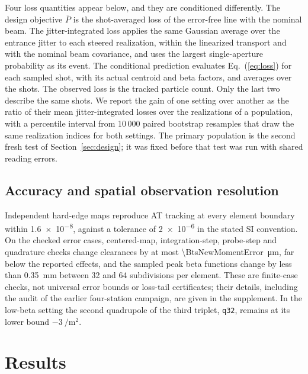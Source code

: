 \documentclass[final,5p,twocolumn]{elsarticle}
\begin{document}
Four loss quantities appear below, and they are conditioned differently. The design
objective $\bar P$ is the shot-averaged loss of the error-free line with the nominal beam.
The jitter-integrated loss applies the same Gaussian average over the entrance jitter to
each steered realization, within the linearized transport and with the nominal beam
covariance, and uses the largest single-aperture probability as its event. The
conditional prediction evaluates Eq.~(\ref{eq:loss}) for each sampled shot, with its
actual centroid and beta factors, and averages over the shots. The observed loss is the
tracked particle count. Only the last two describe the same shots. We report the gain of
one setting over another as the ratio of their mean jitter-integrated losses over the
realizations of a population, with a percentile interval from 10\,000 paired bootstrap
resamples that draw the same realization indices for both settings. The primary
population is the second fresh test of Section~\ref{sec:design}; it was fixed before that
test was run with shared reading errors.

\subsection{Accuracy and spatial observation resolution}
Independent hard-edge maps reproduce AT tracking at every element boundary within
\num{1.6e-8}, against a tolerance of \num{2e-6} in the stated SI convention. On the checked
error cases, centered-map, integration-step, probe-step and quadrature checks change
clearances by at most \SI{\BtsNewMomentError}{\micro\metre}, far below the reported effects, and the
sampled peak beta functions change by less than \SI{0.35}{\milli\metre} between 32 and 64
subdivisions per element. These are finite-case checks, not universal error bounds or
loss-tail certificates; their details, including the audit of the earlier
four-station campaign, are given in the supplement. In the low-beta setting
the second quadrupole of the third triplet, \texttt{q32}, remains at its lower bound
$\SI{-3}{\per\square\metre}$.

\section{Results}\label{sec:results}
\end{document}
